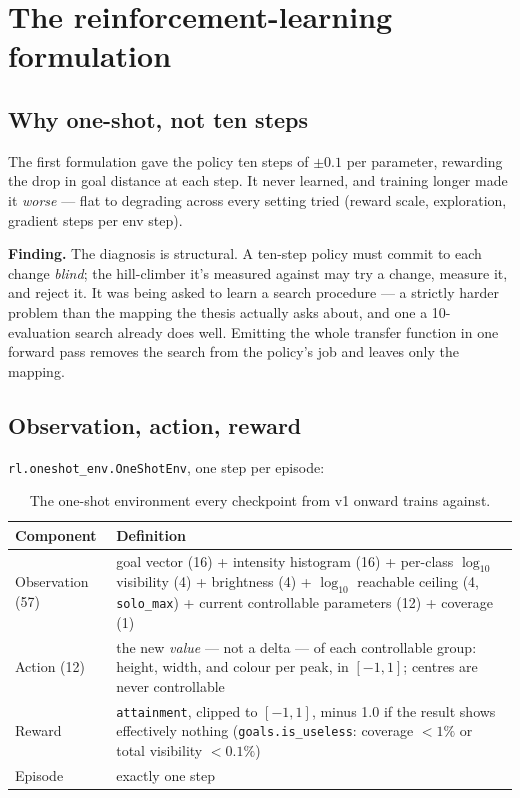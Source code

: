 \documentclass[10pt]{article}
\newcommand{\finding}[1]{\begin{findingbox}\textbf{Finding.} #1\end{findingbox}}
\newcommand{\code}[1]{\texttt{#1}}
\begin{document}
\newpage
\section{The reinforcement-learning formulation}
\label{sec:rl-formulation}

\subsection{Why one-shot, not ten steps}

The first formulation gave the policy ten steps of $\pm 0.1$ per parameter,
rewarding the drop in goal distance at each step. It never learned, and
training longer made it \emph{worse} --- flat to degrading across every
setting tried (reward scale, exploration, gradient steps per env step).

\finding{The diagnosis is structural. A ten-step policy must commit to each
change \emph{blind}; the hill-climber it's measured against may try a
change, measure it, and reject it. It was being asked to learn a search
procedure --- a strictly harder problem than the mapping the thesis actually
asks about, and one a 10-evaluation search already does well. Emitting the
whole transfer function in one forward pass removes the search from the
policy's job and leaves only the mapping.}

\subsection{Observation, action, reward}

\code{rl.oneshot\_env.OneShotEnv}, one step per episode:

\begin{table}[h]
\centering\small
\begin{tabular}{@{}p{2.6cm}p{10.5cm}@{}}
\toprule
\textbf{Component} & \textbf{Definition} \\
\midrule
Observation (57) & goal vector (16) + intensity histogram (16) + per-class
$\log_{10}$ visibility (4) + brightness (4) + $\log_{10}$ reachable ceiling
(4, \code{solo\_max}) + current controllable parameters (12) + coverage (1) \\
Action (12) & the new \emph{value} --- not a delta --- of each controllable
group: height, width, and colour per peak, in $[-1,1]$; centres are never
controllable \\
Reward & \code{attainment}, clipped to $[-1,1]$, minus 1.0 if the result
shows effectively nothing (\code{goals.is\_useless}: coverage $<1\%$ or total
visibility $<0.1\%$) \\
Episode & exactly one step \\
\bottomrule
\end{tabular}
\caption{The one-shot environment every checkpoint from v1 onward trains against.}
\end{table}
\end{document}
